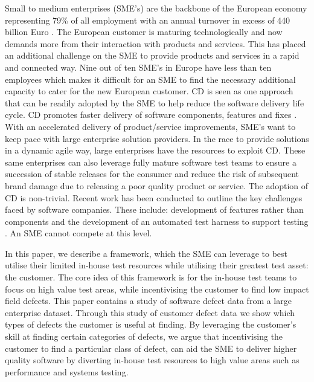Small to medium enterprises (SME's) are the backbone of the European economy representing 79\% of all employment with an annual turnover in excess of 440 billion Euro \cite{eurocom2014sme}. The European customer is maturing technologically and now demands more from their interaction with products and services. This has placed an additional challenge on the SME to provide products and services in a rapid and connected way. Nine out of ten SME's in Europe have less than ten employees \cite{eurocom2014sme} which makes it difficult for an SME to find the necessary additional capacity to cater for the new European customer.  CD is seen as one approach that can be readily adopted by the SME to help reduce the software delivery life cycle. CD promotes faster delivery of software components, features and fixes \cite{humble2010continuous}. With an accelerated delivery of product/service improvements, SME's want to keep pace with large enterprise solution providers.  In the race to provide solutions in a dynamic agile way, large enterprises have the resources to exploit CD. These same enterprises can also leverage fully mature software test teams to ensure a succession of stable releases for the consumer and reduce the risk of subsequent brand damage due to releasing a poor quality product or service. The adoption of CD is non-trivial.  Recent work has been conducted to outline the key challenges faced by software companies. These include: development of features rather than components and the development of an automated test harness to support testing \cite{olsson2012climbing}. An SME cannot compete at this level. \par

In this paper, we describe a framework, which the SME can leverage to best utilise their limited in-house test resources while utilising their greatest test asset: the customer. The core idea of this framework is for the in-house test teams to focus on high value test areas, while incentivising the customer to find   low impact field defects. This paper contains a study of software defect data from a large enterprise dataset. Through this study of customer defect data we show which types of defects the customer is useful at finding. By leveraging the customer's skill at finding certain categories of defects, we argue that incentivising the customer to find a particular class of defect, can aid the SME to deliver higher quality software by diverting in-house test resources to high value areas such as performance and systems testing. \par

